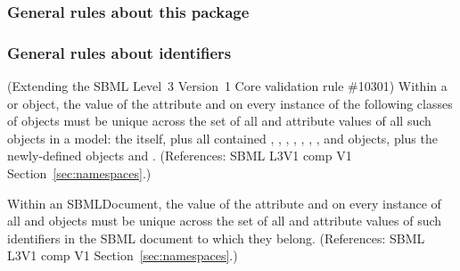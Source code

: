 \subsubsection*{General rules about this package}  \subsubsection*{General rules about identifiers} \begin{sbmlenum}

 {  (Extending the SBML Level~3 Version~1 Core
  validation rule \#10301) Within a \Model or \ExternalModelDefinition
  object, the value of the attribute  and  on
  every instance of the following classes of objects must be unique
  across the set of all  and  attribute values
  of all such objects in a model: the \Model itself, plus all contained
  \FunctionDefinition, \Compartment, \Species, \Reaction,
  \SpeciesReference, \ModifierSpeciesReference, \Event, and \Parameter
  objects, plus the newly-defined objects \Submodel and \Deletion.
  (References: SBML L3V1 comp V1 Section~\ref{sec:namespaces}.) }


 {  Within an SBMLDocument, the value of the
  attribute  and  on every instance of all
  \Model and \ExternalModelDefinition objects must
  be unique across the set of all  and 
  attribute values of such identifiers in the SBML document to which
  they belong.
  (References: SBML L3V1 comp V1 Section~\ref{sec:namespaces}.) }



\end{sbmlenum}
